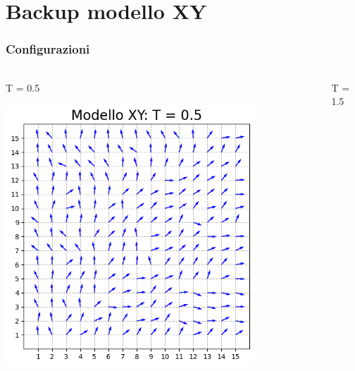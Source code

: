 \section{Backup modello XY}

\begin{frame}
    \frametitle{Configurazioni}
    \framesubtitle{}

    \begin{columns}
        \begin{column}{0.5\textwidth}
            \begin{block}{T = 0.5}

            \centering
            \includegraphics[width=0.8\textwidth]{Immagini/backupXY/conf_T0.5.png}

            \end{block}
        \end{column}
    
        \begin{column}{0.5\textwidth}
            \begin{block}{T = 1.5}


\end{block}
\end{column}
\end{columns}
\end{frame}
